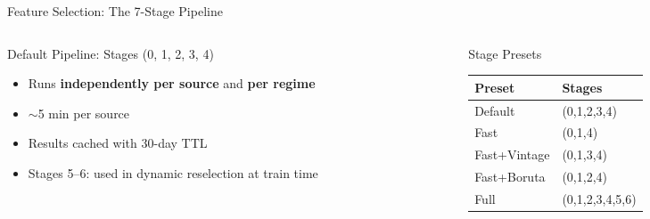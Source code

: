\documentclass[aspectratio=169,10pt]{beamer}
\begin{document}
\begin{frame}{Feature Selection: The 7-Stage Pipeline}
\vspace{0.2cm}
\begin{columns}[T]
\begin{column}{0.55\textwidth}
\begin{block}{Default Pipeline: Stages (0, 1, 2, 3, 4)}
\footnotesize
\begin{itemize}
  \item Runs \textbf{independently per source} and \textbf{per regime}
  \item $\sim$5 min per source
  \item Results cached with 30-day TTL
  \item Stages 5--6: used in dynamic reselection at train time
\end{itemize}
\end{block}
\end{column}
\begin{column}{0.42\textwidth}
\begin{exampleblock}{Stage Presets}
\scriptsize
\begin{tabular}{@{}ll@{}}
\toprule
\textbf{Preset} & \textbf{Stages} \\
\midrule
Default & (0,1,2,3,4) \\
Fast & (0,1,4) \\
Fast+Vintage & (0,1,3,4) \\
Fast+Boruta & (0,1,2,4) \\
Full & (0,1,2,3,4,5,6) \\
\bottomrule
\end{tabular}
\end{exampleblock}
\end{column}
\end{columns}
\end{frame}
\end{document}
